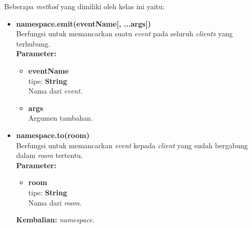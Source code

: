 \begin{enumerate}

	Beberapa \textit{method} yang dimiliki oleh kelas ini yaitu:
	\begin{itemize}
		\item \textbf{namespace.emit(eventName[, ...args])} \\
		Berfungsi untuk memancarkan suatu \textit{event} pada seluruh \textit{clients} yang terhubung. \\
		\textbf{Parameter:}
		\begin{itemize}
			\item \textbf{eventName} \\tipe: \textbf{String} \\ Nama dari \textit{event}.
			\item \textbf{args} \\ Argumen tambahan.
		\end{itemize}
%		
		
		\item \textbf{namespace.to(room)} \\ 
		Berfungsi untuk memancarkan \textit{event} kepada \textit{client} yang sudah bergabung dalam \textit{room} tertentu. \\ 
		\textbf{Parameter:}
		\begin{itemize}
			\item \textbf{room} \\tipe: \textbf{String} \\ Nama dari \textit{room}.
		\end{itemize}
		\textbf{Kembalian:} \textit{namespace}. \\
%	
	

\end{itemize}
\end{enumerate}
